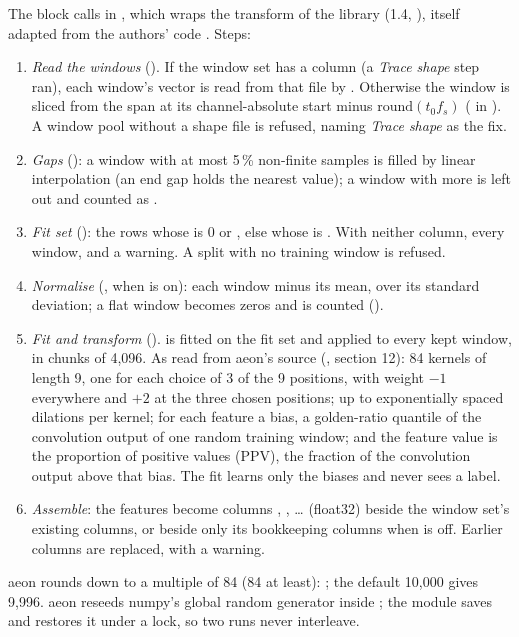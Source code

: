 The block calls  in , which wraps the
 transform of the  library (1.4,
), itself adapted from the authors'
code \citep{dempster2021minirocket}. Steps:
\begin{enumerate}
\item \emph{Read the windows} (). If the window set has a
   column (a \emph{Trace shape} step ran), each window's vector is read from
  that file by . Otherwise the window is sliced from the span at its
  channel-absolute start minus $\mathrm{round}(t_0 f_s)$
  ( in ). A window pool without a
  shape file is refused, naming \emph{Trace shape} as the fix.
\item \emph{Gaps} (): a window with at most 5\,\% non-finite samples is
  filled by linear interpolation (an end gap holds the nearest value); a window with more is
  left out and counted as .
\item \emph{Fit set} (): the rows whose  is 0 or
  , else whose  is . With neither column, every
  window, and a warning. A split with no training window is refused.
\item \emph{Normalise} (, when  is on): each window minus
  its mean, over its standard deviation; a flat window becomes zeros and is counted
  ().
\item \emph{Fit and transform} ().  is fitted on the fit set and
  applied to every kept window, in chunks of 4{,}096. As read from aeon's source
  (, section 12): 84 kernels of
  length 9, one for each choice of 3 of the 9 positions, with weight $-1$ everywhere and
  $+2$ at the three chosen positions; up to  exponentially spaced
  dilations per kernel; for each feature a bias, a golden-ratio quantile of the convolution
  output of one random training window; and the feature value is the proportion of positive
  values (PPV), the fraction of the convolution output above that bias. The fit learns only
  the biases and never sees a label.
\item \emph{Assemble}: the features become columns , ,
  \dots{} (float32) beside the window set's existing columns, or beside only its bookkeeping
  columns when  is off. Earlier  columns are
  replaced, with a warning.
\end{enumerate}
aeon rounds  down to a multiple of 84 (84 at least):
; the default 10{,}000 gives 9{,}996. aeon reseeds numpy's global
random generator inside ; the module saves and restores it under a lock, so two
runs never interleave.

